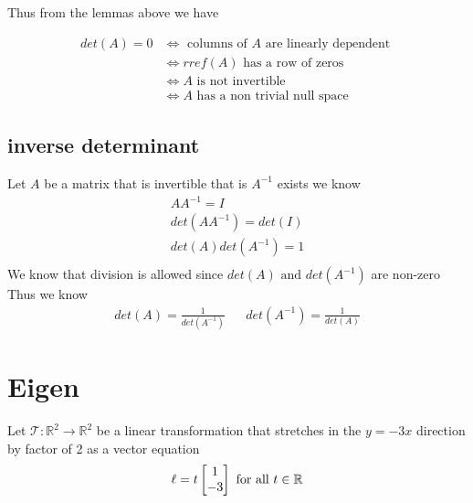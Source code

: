 \documentclass[11pt]{book}
\begin{document}
Thus from the lemmas above we have 
\begin{thm}\label{thm:determinant_properties_}
    \begin{align*}
        \mathit{det} \left(A\right)= 0 &\Leftrightarrow \text{ columns of $A$ are linearly dependent  } \tag{Important!}\\
                                    &\Leftrightarrow  \mathit{rref} \left(A\right) \text{ has a row of zeros  } \\
                                    & \Leftrightarrow A \text{ is not invertible  } \\
                                    & \Leftrightarrow A \text{ has a non trivial null space  } 
    \end{align*}
\end{thm}

\subsection{inverse determinant }%
\label{sub:inverse_determinant_}

Let $A$ be a matrix that is invertible that is $A^{-1} $ exists we know
\begin{gather*}
    AA^{-1} = I\\
    \mathit{det} \left(AA^{-1} \right) = \mathit{det} \left(I\right) \\
    \mathit{det} \left(A\right) \mathit{det} \left(A^{-1} \right) = 1\\
\end{gather*}
We know that division is allowed since $\mathit{det} \left(A\right) \text{ and } \mathit{det} \left(A^{-1} \right) $ are non-zero 
Thus we know 
\begin{align*}
    \boxed{\mathit{det} \left(A\right) = \frac{1}{\mathit{det} \left(A^{-1} \right) }} && \boxed{\mathit{det} \left(A^{-1} \right) = \frac{1}{\mathit{det} \left(A\right) }}
\end{align*}



\section{Eigen}%
\label{sec:eigen}

Let $\mathcal{T}  : \mathbb{R} ^2  \to \mathbb{R} ^2  $ be a linear transformation that stretches in the $y= -3x$ direction by factor of 2 as a vector equation 
\[
\ell = t\begin{bmatrix} 1 \\ -3 \end{bmatrix} \text{ for all  } t \in \mathbb{R}
\]
\end{document}
